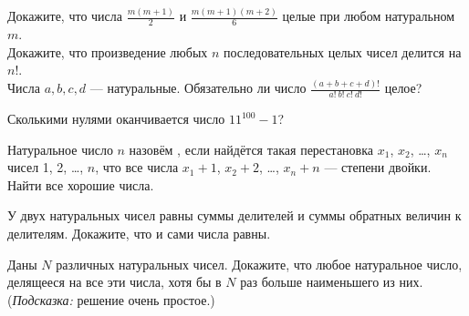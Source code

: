 \documentclass[12pt,a4paper]{article}
\begin{document}
Докажите, что числа $\frac{m(m+1)}{2}$ и $\frac{m(m+1)(m+2)}6$ целые при любом натуральном $m$.
\\
Докажите, что произведение любых $n$ последовательных
целых чисел делится на $n!$.\\
 Числа $a,b,c,d$ --- натуральные. Обязательно ли число
$\frac{(a+b+c+d)!}{a!\ b!\ c!\ d!}$ целое?

Сколькими нулями оканчивается число $11^{100}-1$?

 Натуральное
число $n$ назов\"ем , если найд\"ется такая
перестановка $x_1$, $x_2$, \dots, $x_n$ чисел 1, 2, \dots, $n$, что
все числа $x_1+1$, $x_2+2$, \dots, $x_n+n$ --- степени двойки.
Найти все хорошие числа.

У %
двух натуральных чисел
равны суммы делителей и суммы обратных величин к делителям. Докажите, что %
и сами числа равны.

Даны $N$ различных натуральных чисел. Докажите, что любое натуральное число, делящееся на все эти числа, хотя бы в $N$ раз больше наименьшего из них.
({\em Подсказка:} решение очень простое.)


\end{document}
